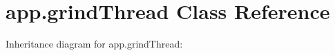 \hypertarget{classapp_1_1grindThread}{}\section{app.\+grind\+Thread Class Reference}
\label{classapp_1_1grindThread}


Inheritance diagram for app.\+grind\+Thread\+:
